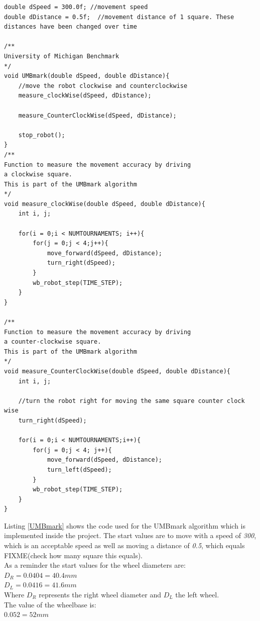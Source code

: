 \begin{lstlisting}[caption={The UMBmark experiment procedure}, label={UMBmark}]
double dSpeed = 300.0f; //movement speed
double dDistance = 0.5f;  //movement distance of 1 square. These distances have been changed over time

/**
University of Michigan Benchmark
*/
void UMBmark(double dSpeed, double dDistance){	
	//move the robot clockwise and counterclockwise 
	measure_clockWise(dSpeed, dDistance);
	
	measure_CounterClockWise(dSpeed, dDistance);
	
	stop_robot();
} 
/**
Function to measure the movement accuracy by driving
a clockwise square.
This is part of the UMBmark algorithm
*/
void measure_clockWise(double dSpeed, double dDistance){
	int i, j;
	
	for(i = 0;i < NUMTOURNAMENTS; i++){
		for(j = 0;j < 4;j++){
			move_forward(dSpeed, dDistance);
			turn_right(dSpeed);
		}
		wb_robot_step(TIME_STEP);
	}
}  

/**
Function to measure the movement accuracy by driving
a counter-clockwise square.
This is part of the UMBmark algorithm
*/
void measure_CounterClockWise(double dSpeed, double dDistance){
	int i, j; 
	
	//turn the robot right for moving the same square counter clock wise
	turn_right(dSpeed);
	
	for(i = 0;i < NUMTOURNAMENTS;i++){		
		for(j = 0;j < 4; j++){
			move_forward(dSpeed, dDistance);
			turn_left(dSpeed);
		}
		wb_robot_step(TIME_STEP);
	}
} 
\end{lstlisting}

Listing \ref{UMBmark} shows the code used for the UMBmark algorithm which is implemented inside the project. The start values are to move with a speed of \textit{300}, which is an acceptable speed as well as moving a distance of \textit{0.5}, which equals FIXME(check how many square this equals).\\
As a reminder the start values for the wheel diameters are:\\
$D_{R} = 0.0404 = 40.4mm$\\
$D_{L} = 0.0416 = 41.6mm$\\
Where $D_{R}$ represents the right wheel diameter and  $D_{L}$ the left wheel.\\
The value of the wheelbase is:\\
$0.052 = 52mm$\\ 

